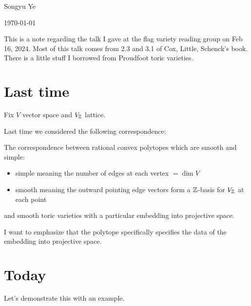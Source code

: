 \documentclass[12pt]{article}
\begin{document}
Songyu Ye

\today

\hfill

This is a note regarding the talk I gave at the flag variety reading group on Feb 16, 2024.
Most of this talk comes from 2.3 and 3.1 of Cox, Little, Schenck's book. There is a little stuff I borrowed
from Proudfoot toric varieties.

\section{Last time}
Fix $V$ vector space and $V_{\mathbb{Z}}$ lattice.

Last time we considered the following correspondence:

\hfill

The correspondence between rational convex polytopes which are smooth and simple: \begin{itemize}
	\item simple meaning the number of edges at each vertex $= \dim V$
	\item smooth meaning the outward pointing edge vectors form a $\mathbb{Z}$-basis for $V_{\mathbb{Z}}$ at each point
\end{itemize} and smooth toric varieties with a particular embedding into projective space.

\hfill

I want to emphasize that the polytope specifically specifies the data of the embedding into projective space.

\section{Today}
Let's demonstrate this with an example.
\end{document}
